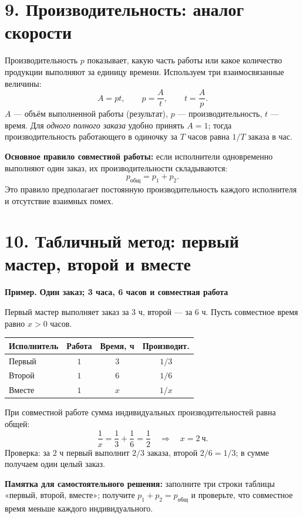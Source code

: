 \documentclass[a4paper,12pt]{article}
\newcommand{\key}[1]{\textcolor{darkaccent}{\textbf{#1}}}
\newcommand{\ex}[1]{\par\smallskip\noindent\key{Пример.} \textbf{#1}\par\smallskip}
\begin{document}
\section*{9. Производительность: аналог скорости}
Производительность $p$ показывает, какую часть работы или какое количество продукции выполняют за единицу времени. Используем три взаимосвязанные величины:
\[
\boxed{\displaystyle A=pt},\qquad
\boxed{\displaystyle p=\frac At},\qquad
\boxed{\displaystyle t=\frac Ap}.
\]
$A$ --- объём выполненной работы (результат), $p$ --- производительность, $t$ --- время. Для \emph{одного полного заказа} удобно принять $A=1$; тогда производительность работающего в одиночку за $T$ часов равна $1/T$ заказа в час.

\key{Основное правило совместной работы:} если исполнители одновременно выполняют один заказ, их производительности складываются:
\[
\boxed{\displaystyle p_{\text{общ}}=p_1+p_2.}
\]
Это правило предполагает постоянную производительность каждого исполнителя и отсутствие взаимных помех.

\section*{10. Табличный метод: первый мастер, второй и вместе}
\ex{Один заказ; 3 часа, 6 часов и совместная работа}
Первый мастер выполняет заказ за $3$ ч, второй --- за $6$ ч. Пусть совместное время равно $x>0$ часов.
\begin{center}
\begin{tabularx}{\linewidth}{@{}Yccc@{}}
\toprule
\textbf{Исполнитель} & \textbf{Работа} & \textbf{Время, ч} & \textbf{Производит.} \\
\midrule
Первый & $1$ & $3$ & $1/3$ \\
Второй & $1$ & $6$ & $1/6$ \\
Вместе & $1$ & $x$ & $1/x$ \\
\bottomrule
\end{tabularx}
\end{center}
При совместной работе сумма индивидуальных производительностей равна общей:
\[
\frac1x=\frac13+\frac16=\frac12
\quad\Longrightarrow\quad \boxed{x=2\ \text{ч}}.
\]
Проверка: за $2$ ч первый выполнит $2/3$ заказа, второй $2/6=1/3$; в сумме получаем один целый заказ.

\key{Памятка для самостоятельного решения:} заполните три строки таблицы
«первый, второй, вместе»; получите $p_1+p_2=p_{\text{общ}}$ и проверьте,
что совместное время меньше каждого индивидуального.
\end{document}
